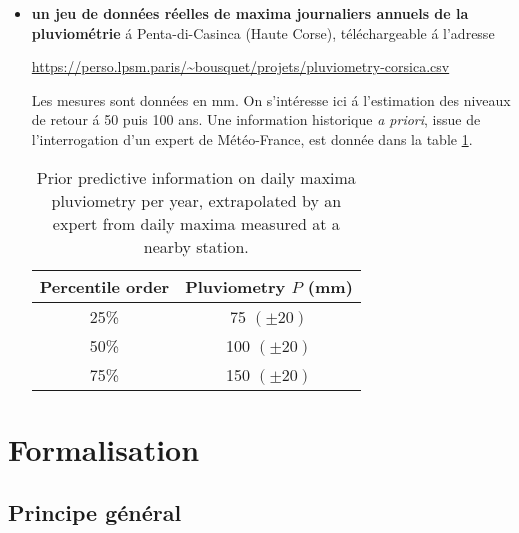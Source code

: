 \documentclass[10pt]{article}
\newcommand{\1}{\mathbbm{1}}
\begin{document}
\begin{itemize}
\item {\bf un jeu de donn\'ees r\'eelles de maxima journaliers annuels de la pluviom\'etrie} \'a Penta-di-Casinca (Haute Corse),  t\'el\'echargeable \'a l'adresse \\
\begin{center}
\url{https://perso.lpsm.paris/~bousquet/projets/pluviometry-corsica.csv} \\
\end{center}

\vspace{0.5cm}

Les mesures sont donn\'ees en mm. On s'int\'eresse ici \'a l'estimation des niveaux de retour \'a 50 puis 100 ans. Une information historique {\it a priori}, issue de l'interrogation d'un expert de M\'et\'eo-France, est donn\'ee dans la table \ref{expertise-corsica}.  \\

\begin{table}[hbtp]
\centering
\begin{tabular}{cc}
Percentile order     & Pluviometry $P$ (mm) \\
 \hline
25\%   &  75  $(\pm 20)$ \\ 
50\%  &  100 $(\pm 20)$ \\
75\%    & 150 $(\pm 20)$ \\
\hline
\end{tabular}
\caption{Prior predictive information on daily maxima pluviometry  per year, extrapolated by an expert from daily maxima measured at a nearby station. }
\label{expertise-corsica}
\end{table}

\end{itemize}



\section{Formalisation}

\subsection{Principe g\'en\'eral}
\end{document}

